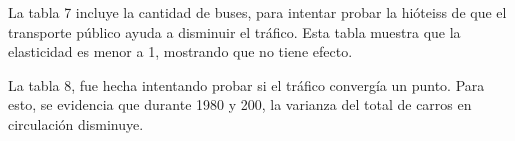 \documentclass[
]{article}
\begin{document}


La tabla 7 incluye la cantidad de buses, para intentar probar la
hióteiss de que el transporte público ayuda a disminuir el tráfico. Esta
tabla muestra que la elasticidad es menor a 1, mostrando que no tiene
efecto.



La tabla 8, fue hecha intentando probar si el tráfico convergía un
punto. Para esto, se evidencia que durante 1980 y 200, la varianza del
total de carros en circulación disminuye.






\end{document}

